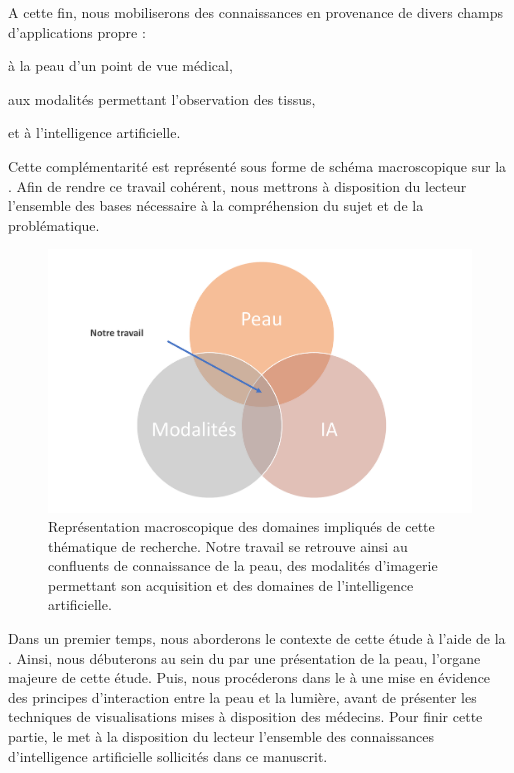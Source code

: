 A cette fin, nous mobiliserons des connaissances en provenance de divers champs d'applications propre :
\begin{inlinerate}
    \item à la peau d'un point de vue médical, 
    \item aux modalités permettant l'observation des tissus,
    \item et à l'intelligence artificielle.
\end{inlinerate} Cette complémentarité est représenté sous forme de schéma macroscopique sur la . Afin de rendre ce travail cohérent, nous mettrons à disposition du lecteur l'ensemble des bases nécessaire à la compréhension du sujet et de la problématique.\par

\begin{figure}[H]
    \centering
    \includegraphics[width=0.8\linewidth]{contents/i_introduction/resources/scheme_our_work.pdf}
    \caption{Représentation macroscopique des domaines impliqués de cette thématique de recherche. Notre travail se retrouve ainsi au confluents de connaissance de la peau, des modalités d'imagerie permettant son acquisition et des domaines de l'intelligence artificielle.}
    \label{fig:scheme_our_work}
\end{figure}\par

Dans un premier temps, nous aborderons le contexte de cette étude à l'aide de la . Ainsi, nous débuterons au sein du  par une présentation de la peau, l'organe majeure de cette étude. Puis, nous procéderons dans le  à une mise en évidence des principes d'interaction entre la peau et la lumière, avant de présenter les techniques de visualisations mises à disposition des médecins. Pour finir cette partie, le  met à la disposition du lecteur l'ensemble des connaissances d'intelligence artificielle sollicités dans ce manuscrit.\par

